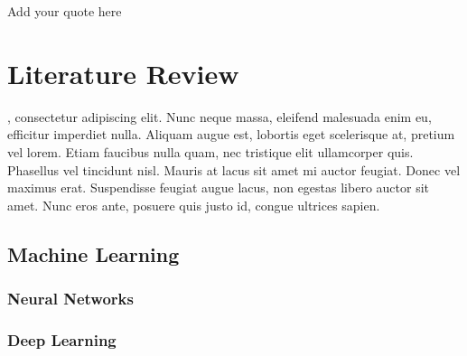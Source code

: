 \begin{savequote}[75mm]
Add your quote here
\end{savequote}

\chapter{Literature Review}
\label{literature}
, consectetur adipiscing elit. Nunc neque massa, eleifend malesuada enim eu, efficitur imperdiet nulla. Aliquam augue est, lobortis eget scelerisque at, pretium vel lorem. Etiam faucibus nulla quam, nec tristique elit ullamcorper quis. Phasellus vel tincidunt nisl. Mauris at lacus sit amet mi auctor feugiat. Donec vel maximus erat. Suspendisse feugiat augue lacus, non egestas libero auctor sit amet. Nunc eros ante, posuere quis justo id, congue ultrices sapien.

\clearpage


\section{Machine Learning}

\subsection{Neural Networks}


\subsection{Deep Learning}

